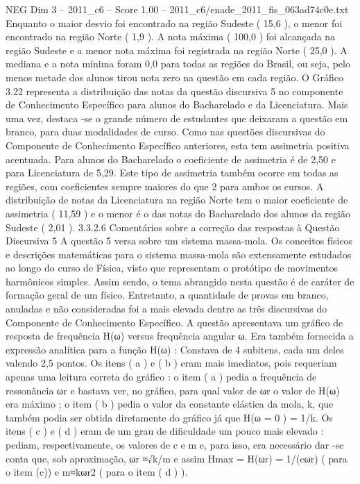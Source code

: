 \begin{textsample}{NEG Dim 3 – 2011\_c6 – Score 1.00 – 2011\_c6/enade\_2011\_fis\_063ad74c0e.txt}
Enquanto o maior desvio foi encontrado na região Sudeste ( 15,6 ), o menor foi encontrado na região Norte ( 1,9 ).
A nota máxima ( 100,0 ) foi alcançada na região Sudeste e a menor nota máxima foi registrada na região Norte ( 25,0 ).
A mediana e a nota mínima foram 0,0 para todas as regiões do Brasil, ou seja, pelo menos metade dos alunos tirou nota zero na questão em cada região.
O Gráfico 3.22 representa a distribuição das notas da questão discursiva 5 no componente de Conhecimento Específico para alunos do Bacharelado e da Licenciatura.
Mais uma vez, destaca -se o grande número de estudantes que deixaram a questão em branco, para duas modalidades de curso.
Como nas questões discursivas do Componente de Conhecimento Específico anteriores, esta tem assimetria positiva acentuada.
Para alunos do Bacharelado o coeficiente de assimetria é de 2,50 e para Licenciatura de 5,29.
Este tipo de assimetria também ocorre em todas as regiões, com coeficientes sempre maiores do que 2 para ambos os cursos.
A distribuição de notas da Licenciatura na região Norte tem o maior coeficiente de assimetria ( 11,59 ) e o menor é o das notas do Bacharelado dos alunos da região Sudeste ( 2,01 ). 3.3.2.6 Comentários sobre a correção das respostas à Questão Discursiva 5 A questão 5 versa sobre um sistema massa-mola.
Os conceitos físicos e descrições matemáticas para o sistema massa-mola são extensamente estudados ao longo do curso de Física, visto que representam o protótipo de movimentos harmônicos simples.
Assim sendo, o tema abrangido nesta questão é de caráter de formação geral de um físico.
Entretanto, a quantidade de provas em branco, anuladas e não consideradas foi a mais elevada dentre as três discursivas do Componente de Conhecimento Específico.
A questão apresentava um gráfico de resposta de frequência H(ω) versus frequência angular ω.
Era também fornecida a expressão analítica para a função H(ω) : Constava de 4 subitens, cada um deles valendo 2,5 pontos.
Os itens ( a ) e ( b ) eram mais imediatos, pois requeriam apenas uma leitura correta do gráfico : o item ( a ) pedia a frequência de ressonância ωr e bastava ver, no gráfico, para qual valor de ωr o valor de H(ω) era máximo ; o item ( b ) pedia o valor da constante elástica da mola, k, que também podia ser obtida diretamente do gráfico já que H(ω = 0 ) = 1/k.
Os itens ( c ) e ( d ) eram de um grau de dificuldade um pouco mais elevado : pediam, respectivamente, os valores de c e m e, para isso, era necessário dar -se conta que, sob aproximação, ωr ≈√k/m e assim Hmax = H(ωr) = 1/(cωr) ( para o item (c)) e m≈kωr2 ( para o item ( d ) ).

\end{textsample}
